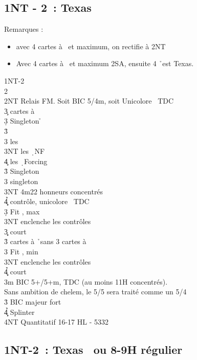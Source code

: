 \documentclass[a4paper]{article}
\begin{document}
\subsection{1NT - 2\pdfh\ : Texas \pdfs}

Remarques :

\begin{itemize}
\item avec 4 cartes à \s\ et maximum, on rectifie à 2NT

\item Avec 4 cartes à \s\ et maximum 2SA, ensuite 4 \h\ est Texas.

\end{itemize}

\begin{bidtable}
1NT-2\h\\
2\s\+\\
2NT \> Relais FM. Soit BIC 5\s /4m, soit Unicolore \s\ TDC\+\\
3\c {} cartes à \s \+\\
3\d \> Singleton \h \+\\
3\h\+\\
3\s \> les \c \\
3NT \> les \d\ NF\\
4\c \> les \d\ Forcing\-\-\\
3\h \> Singleton \c \\
3\s \> singleton \d \\
3NT \s 4m22 honneurs concentrés\\
4\c\d\h \> contrôle, unicolore \s\ TDC\-\\
3\d \> Fit \s , max\+\\
3NT \> enclenche les contrôles\\
3\c\d \> court\-\\
3\h {} cartes à \h\ sans 3 cartes à \s \\
3\s \> Fit \s , min\+\\
3NT \> enclenche les contrôles\\
4\c\d\h \> court\-\-\\
3m \> BIC 5+\s /5+m, TDC (au moins 11H concentrés).\\
\>Sans ambition de chelem, le 5/5 sera traité comme un 5/4\\
3\h \> BIC majeur fort\\
4\c\d\h \> Splinter\\
4NT \> Quantitatif 16-17 HL - 5332\-
\end{bidtable}

\subsection{1NT-2\pdfs\ : Texas \pdfc\ ou 8-9H régulier}
\end{document}
